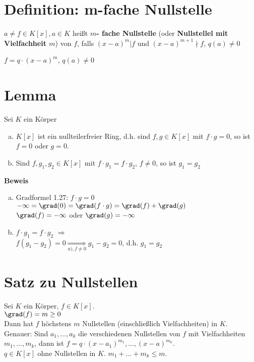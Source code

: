 	\section{Definition: m-fache Nullstelle}

	$a\neq f\in K[x],a\in K$ heißt \textbf{$m$- fache Nullstelle} (oder \textbf{Nullstellel mit Vielfachheit $m$}) von $f$, falls $(x-a)^m|f$ und $(x-a)^{m+1}\nmid f$, $q(a)\neq 0$

	$f=q\cdot(x-a)^m$, $q(a)\neq 0$

	\section{Lemma}

	Sei $K$ ein Körper
	\begin{enumerate}[a)]
	\item $K[x]$ ist ein nullteilerfreier Ring, d.h. sind $f,g\in K[x]$ mit $f\cdot g=0$, so ist $f=0$ oder $g=0$.
	\item Sind $f,g_1,g_2\in K[x]$ mit $f\cdot g_1=f\cdot g_2$, $f\neq 0$, so ist $g_1=g_2$
	\end{enumerate}

	\textbf{Beweis}
	\begin{enumerate}[a)]
	\item Gradformel 1.27: $f\cdot g=0$\\
	$-\infty=\grad(0)=\grad(f\cdot g)=\grad(f)+\grad(g)$\\
$	\grad(f)=-\infty$ oder $\grad(g)=-\infty$
\item $f\cdot g_1=f\cdot g_2$ $\Rightarrow$\\
$f(g_1-g_2)=0\underset{\scriptstyle{a),f\neq 0}}{\Rightarrow} g_1-g_2=0$, d.h. $g_1=g_2$
	\end{enumerate}

	\section{Satz zu Nullstellen}

	Sei $K$ ein Körper, $f\in K[x]$.\\
	$\grad(f)=m\geq 0$\\
	Dann hat $f$ höchstens $m$ Nullstellen (einschließlich Vielfachheiten) in $K$.\\
	Genauer: Sind $a_1,...,a_k$ die verschiedenen Nullstellen von $f$ mit Vielfachheiten $m_1,...,m_k$, dann ist $f=q\cdot(x-a_1)^{m_1},...,(x-a)^{m_k}$.\\
	$q\in K[x]$ ohne Nullstellen in $K$. $m_1+...+m_k\leq m$.

